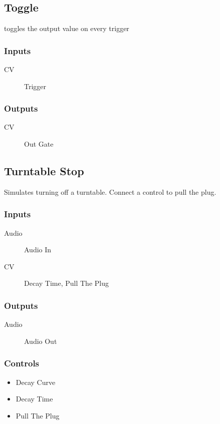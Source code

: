 \subsection{Toggle}

toggles the output value on every trigger



\subsubsection{Inputs}
\begin{description}
\item [CV] Trigger
\end{description}

\subsubsection{Outputs}
\begin{description}
\item [CV] Out Gate
\end{description}

\subsection{Turntable Stop}

Simulates turning off a turntable. Connect a control to pull the plug.



\subsubsection{Inputs}
\begin{description}
\item [Audio] Audio In
\item [CV] Decay Time, Pull The Plug
\end{description}

\subsubsection{Outputs}
\begin{description}
\item [Audio] Audio Out
\end{description}

\subsubsection{Controls}
\begin{itemize}
\item Decay Curve
\item Decay Time
\item Pull The Plug
\end{itemize}

